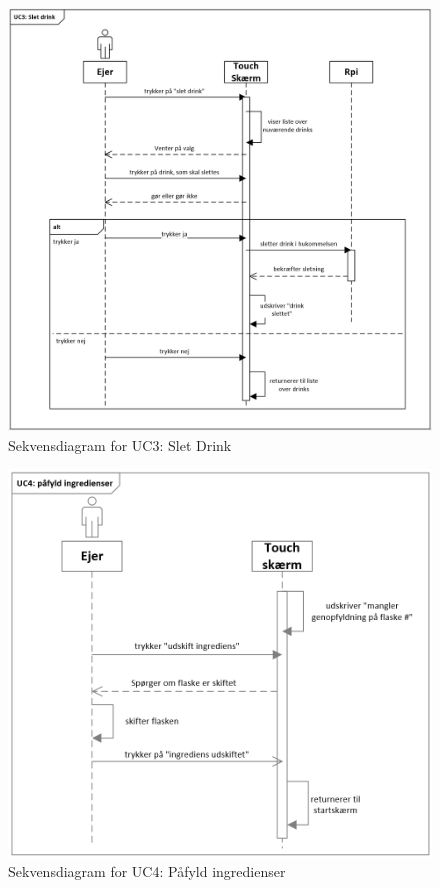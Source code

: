 \begin{figure}[H]
	\centering
	\includegraphics[width=1\textwidth]{Images/UC3sletdrink.png}
	\caption{Sekvensdiagram for UC3: Slet Drink}
	\label{fig:UC3}
\end{figure}

\begin{figure}[H]
	\centering
	\includegraphics[width=1\textwidth]{Images/UC4paafyldingredienser.png}
	\caption{Sekvensdiagram for UC4: Påfyld ingredienser}
	\label{fig:UC4}
\end{figure}

